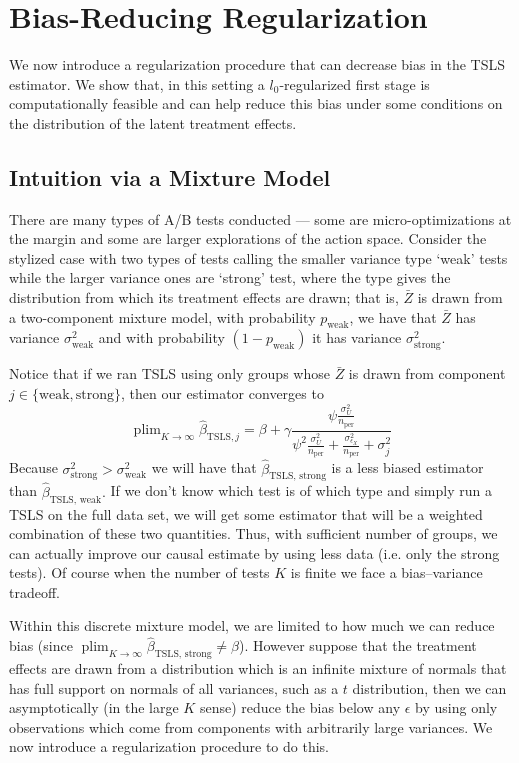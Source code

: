 \documentclass{article}
\newcommand\nper{{n_{\text{per}}}}
\DeclareMathOperator*{\plim}{plim}
\begin{document}
\section{Bias-Reducing Regularization}
We now introduce a regularization procedure that can decrease bias in the TSLS estimator. We show that, in this setting a $l_0$-regularized first stage is computationally feasible and can help reduce this bias under some conditions on the distribution of the latent treatment effects.

\subsection{Intuition via a Mixture Model}
There are many types of A/B tests conducted --- some are micro-optimizations at the margin and some are larger explorations of the action space. Consider the stylized case with two types of tests calling the smaller variance type `weak' tests while the larger variance ones are `strong' test, where the type gives the distribution from which its treatment effects are drawn; that is, $\bar{Z}$ is drawn from a two-component mixture model, with probability $p_{\text{weak}}$, we have that $\bar{Z}$ has variance $\sigma^2_{\text{weak}}$ and with probability $(1-p_{\text{weak}})$ it has variance $\sigma^2_{\text{strong}}$. 

Notice that if we ran TSLS using only groups whose $\bar{Z}$ is drawn from component $j \in \{\text{weak}, \text{strong} \}$, then our estimator converges to
$$
\plim_{K \to \infty} \hat{\beta}_{\text{TSLS}, j}  = \beta + \gamma \frac{ \psi \frac{\sigma^2_{U}}{\nper}}{\psi^{2} \frac{\sigma^2_U}{\nper}  + \frac{\sigma^2_{\epsilon_{X}}}{\nper} + \sigma^2_{j}}
$$
Because $\sigma^2_\text{strong} > \sigma^2_\text{weak}$ we will have that $\hat{\beta}_{\text{TSLS, strong}}$ is a less biased estimator than $\hat{\beta}_{\text{TSLS, weak}}.$ If we don't know which test is of which type and simply run a TSLS on the full data set, we will get some estimator that will be a weighted combination of these two quantities. Thus, with sufficient number of groups, we can actually improve our causal estimate by using less data (i.e. only the strong tests). Of course when the number of tests $K$ is finite we face a bias--variance tradeoff.

Within this discrete mixture model, we are limited to how much we can reduce bias (since $\plim_{K \to \infty} \hat{\beta}_\text{TSLS, strong} \neq \beta$). However suppose that the treatment effects are drawn from a distribution which is an infinite mixture of normals that has full support on normals of all variances, such as a $t$ distribution, then we can asymptotically (in the large $K$ sense) reduce the bias below any $\epsilon$ by using only observations which come from components with arbitrarily large variances. We now introduce a regularization procedure to do this.
\end{document}
